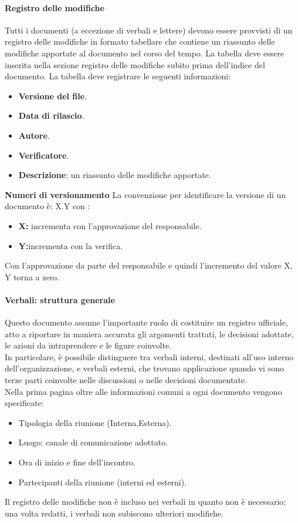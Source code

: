 \documentclass{article}
\begin{document}
\paragraph{Registro delle modifiche}
Tutti i documenti (a eccezione di verbali e
lettere) devono essere provvisti di un registro delle modifiche in formato tabellare che contiene un riassunto
delle modifiche apportate al documento nel corso del tempo.
La tabella  deve essere inserita nella
sezione registro delle modifiche subito prima dell’indice del documento.
La tabella deve registrare le seguenti informazioni:
\begin{itemize}
\item \textbf{Versione del file}.
\item \textbf{Data di rilascio}.
\item \textbf{Autore}.
\item \textbf{Verificatore}.
\item \textbf{Descrizione}: un riassunto delle modifiche apportate.
\end{itemize}
\textbf{Numeri di versionamento}
 La convenzione per identificare la versione di un documento è: X.Y
con :
\begin{itemize}
 \item \textbf{X:} incrementa con l'approvazione del responsabile.
 \item \textbf{Y:}incrementa con la verifica.
\end{itemize}

Con l'approvazione da parte del responsabile e quindi l'incremento del valore X, Y torna a zero.

\paragraph{Verbali: struttura generale}
Questo documento assume l'importante ruolo di costituire un registro ufficiale, atto a riportare in maniera accurata gli argomenti trattati, le decisioni adottate, le azioni da intraprendere e le figure coinvolte.\\
In particolare, è possibile distinguere tra verbali interni, destinati all'uso interno dell'organizzazione, e verbali esterni, che trovano applicazione quando vi sono terze parti coinvolte nelle discussioni o nelle decisioni documentate.\\ 
Nella prima pagina oltre alle informazioni comuni a ogni documento vengono specificate:
\begin{itemize}
    \item Tipologia della riunione (Interna,Esterna).
    \item Luogo: canale di comunicazione adottato.
    \item Ora di inizio e fine dell'incontro.
    \item Partecipanti della riunione (interni ed esterni).
\end{itemize}
Il registro delle modifiche non è incluso nei verbali in quanto non è necessario; una volta redatti, i verbali non subiscono ulteriori modifiche.
\end{document}
